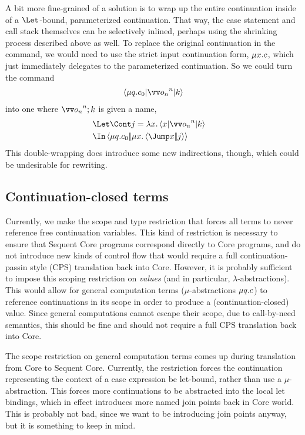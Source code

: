 \documentclass{article}
\begin{document}
A bit more fine-grained of a solution is to wrap up the entire continuation
inside of a $\Let$-bound, parameterized continuation.  That way, the case
statement and call stack themselves can be selectively inlined, perhaps using
the shrinking process described above as well.  To replace the original
continuation in the command, we would need to use the strict input continuation
form, $\mu{x}.c$, which just immediately delegates to the parameterized
continuation.  So we could turn the command
\begin{align*}
  \braket{\comp{q}\cmd_0 | \vect[n]{\frm_n} | \ko}
\end{align*}
into one where $\vect[n]{\frm_n} \then \ko$ is given a name,
\begin{align*}
  &\Let
    \begin{aligned}[t]
      \Cont j &= \fnk{x}\braket{x | \vect[n]{\frm_n} | \ko}
    \end{aligned}
  \\
  &\In
    \cut{\comp{q}\cmd_0}{\letin{x}\jump{x}{j}}
\end{align*}
This double-wrapping does introduce some new indirections, though, which could
be undesirable for rewriting.

\subsection{Continuation-closed terms}

Currently, we make the scope and type restriction that forces all terms to never
reference free continuation variables.  This kind of restriction is necessary to
ensure that Sequent Core programs correspond directly to Core programs, and do
not introduce new kinds of control flow that would require a full
continuation-passin style (CPS) translation back into Core.  However, it is
probably sufficient to impose this scoping restriction on \emph{values} (and in
particular, $\lambda$-abstractions).  This would allow for general computation
terms ($\mu$-abstractions $\mu{q}.c$) to reference continuations in its
scope in order to produce a (continuation-closed) value.  Since general
computations cannot escape their scope, due to call-by-need semantics, this
should be fine and should not require a full CPS translation back into Core.

The scope restriction on general computation terms comes up during translation
from Core to Sequent Core.  Currently, the restriction forces the continuation
representing the context of a case expression be let-bound, rather than use a
$\mu$-abstraction.  This forces more continuations to be abstracted into the
local let bindings, which in effect introduces more named join points back in
Core world.  This is probably not bad, since we want to be introducing join
points anyway, but it is something to keep in mind.
\end{document}
